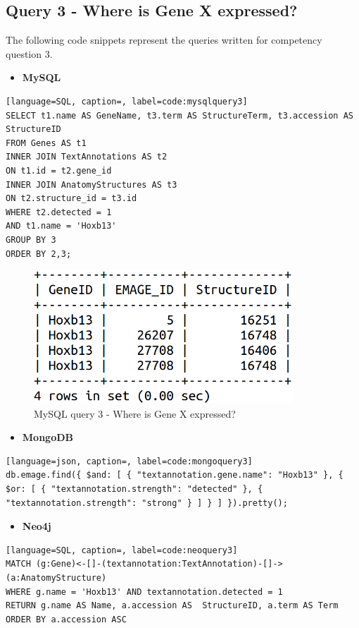 \newpage
\subsection*{Query 3 - Where is Gene X expressed?}\label{query3}
The following code snippets represent the queries written for competency question 3.

\begin{itemize}[leftmargin=*]
\item \textbf{MySQL}
\end{itemize}

\begin{lstlisting}[language=SQL, caption=, label=code:mysqlquery3]
SELECT t1.name AS GeneName, t3.term AS StructureTerm, t3.accession AS StructureID
FROM Genes AS t1
INNER JOIN TextAnnotations AS t2
ON t1.id = t2.gene_id
INNER JOIN AnatomyStructures AS t3
ON t2.structure_id = t3.id
WHERE t2.detected = 1
AND t1.name = 'Hoxb13'
GROUP BY 3
ORDER BY 2,3;
\end{lstlisting}

\begin{figure}[H]\begin{center}\includegraphics[height=5cm,width=0.7\linewidth]{images/mysqlquery3}\caption{MySQL query 3 - Where is Gene X expressed?}\label{fig:mysqlquery3}\end{center}\end{figure}

\begin{itemize}[leftmargin=*]
\item \textbf{MongoDB}
\end{itemize}

\begin{lstlisting}[language=json, caption=, label=code:mongoquery3]
db.emage.find({ $and: [ { "textannotation.gene.name": "Hoxb13" }, { $or: [ { "textannotation.strength": "detected" }, { "textannotation.strength": "strong" } ] } ] }).pretty();
\end{lstlisting}

\begin{itemize}[leftmargin=*]
\item \textbf{Neo4j}

\end{itemize}\begin{lstlisting}[language=SQL, caption=, label=code:neoquery3]
MATCH (g:Gene)<-[]-(textannotation:TextAnnotation)-[]->(a:AnatomyStructure)
WHERE g.name = 'Hoxb13' AND textannotation.detected = 1
RETURN g.name AS Name, a.accession AS  StructureID, a.term AS Term
ORDER BY a.accession ASC
\end{lstlisting}


